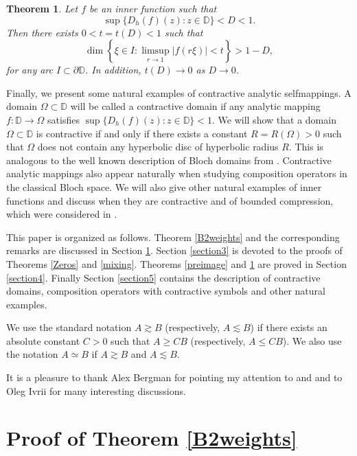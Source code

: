 \documentclass[a4paper,12pt]{article}
\newtheorem{theorem}{Theorem}[section]
\theoremstyle{definition}
\numberwithin{equation}{section}
\newcommand{\D}{\mathbb D}
\begin{document}

 \begin{theorem}
 \label{limsup}
Let $f$ be an inner function such that
$$
\sup \{D_h (f) (z) : z  \in \mathbb{D} \}<D<1 .
$$
Then there exists $0<t=t(D)<1$ such that
$$
\operatorname{dim}\left\{\xi \in I: \limsup_{r \rightarrow 1}|f(r\xi)| < t \right\}>1-D,
$$
for any arc $I \subset \partial \mathbb{D}$. In addition, $t(D) \rightarrow 0$ as $D \rightarrow 0$.
 \end{theorem}

Finally, we present some natural examples of contractive analytic selfmappings. A domain $\Omega \subset  \mathbb{D}$ will be called a contractive domain if any analytic mapping $f: \D \rightarrow \Omega$ satisfies $\sup \{D_h (f) (z) : z \in \D\} < 1$. We will show that a domain $\Omega \subset \D$ is contractive if and only if there exists a constant $R=R(\Omega) >0$ such that $\Omega$ does not contain any hyperbolic disc of hyperbolic radius $R$. This is analogous to the well known description of Bloch domains from \cite{ACP}. Contractive analytic mappings also appear naturally when studying composition operators in the classical Bloch space. We will also give other natural examples of inner functions and discuss when they are contractive and of bounded compression, which were considered in \cite{ivriinicolau2025}. 

This paper is organized as follows. Theorem \ref{B2weights} and the corresponding remarks are discussed  in Section \ref{section2}. Section \ref{section3} is devoted to the proofs of Theorems \ref{Zeros} and \ref{mixing}. Theorems \ref{preimage} and \ref{limsup} are proved in Section \ref{section4}. Finally  Section \ref{section5} contains the description of contractive domains, composition operators with contractive symbols and other natural examples. 

We use the standard notation $A \gtrsim B$ (respectively, $A \lesssim B$) if there exists an absolute constant $C>0$ such that $A \geq CB$ (respectively, $A \leq CB$). We also use the notation $ A \simeq B$ if $A\gtrsim B$ and $A \lesssim B$.

It is a pleasure to thank Alex Bergman for pointing my attention to \cite{Sar} and \cite{AAD} and to Oleg Ivrii for many interesting discussions. 


\section{Proof of Theorem \ref{B2weights}}\label{section2}
\end{document}
